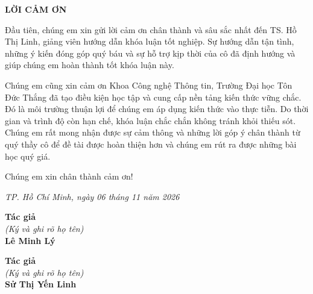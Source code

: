 \newpage
\begin{center}
{\fontsize{16pt}{19.2pt}\selectfont \textbf{LỜI CẢM ƠN}\par}
\end{center}
\vspace{0.5cm}

Đầu tiên, chúng em xin gửi lời cảm ơn chân thành và sâu sắc nhất đến TS. Hồ Thị Linh, giảng viên hướng dẫn khóa luận tốt nghiệp. Sự hướng dẫn tận tình, những ý kiến đóng góp quý báu và sự hỗ trợ kịp thời của cô đã định hướng và giúp chúng em hoàn thành tốt khóa luận này.

Chúng em cũng xin cảm ơn Khoa Công nghệ Thông tin, Trường Đại học Tôn Đức Thắng đã tạo điều kiện học tập và cung cấp nền tảng kiến thức vững chắc. Đó là môi trường thuận lợi để chúng em áp dụng kiến thức vào thực tiễn. Do thời gian và trình độ còn hạn chế, khóa luận chắc chắn không tránh khỏi thiếu sót. Chúng em rất mong nhận được sự cảm thông và những lời góp ý chân thành từ quý thầy cô để đề tài được hoàn thiện hơn và chúng em rút ra được những bài học quý giá.

Chúng em xin chân thành cảm ơn!

\vspace{0.8cm}

\begin{flushright}
\textit{TP. Hồ Chí Minh, ngày 06 tháng 11 năm 2026}
\end{flushright}

\vspace{0.3cm}
\noindent
\begin{minipage}[t]{0.48\textwidth}
    \centering
    \textbf{Tác giả} \\
    \textit{(Ký và ghi rõ họ tên)} \\
    \vspace{2.5cm}
    \textbf{Lê Minh Lý}
\end{minipage}
\hfill
\begin{minipage}[t]{0.48\textwidth}
    \centering
    \textbf{Tác giả} \\
    \textit{(Ký và ghi rõ họ tên)} \\
    \vspace{2.5cm}
    \textbf{Sử Thị Yến Linh}
\end{minipage}